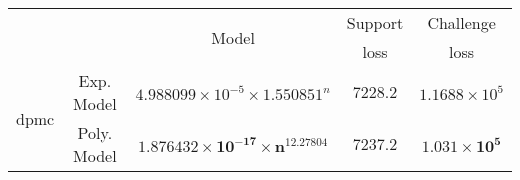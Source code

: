 \begin{tabular}{ccccc} 
\hline 
 &  & \multirow{2}{*}{Model} & Support & Challenge\tabularnewline 
 &  &  & loss  & loss\tabularnewline 
\hline 
\hline 
\multirow{2}{*}{dpmc} & Exp. Model & $4.988099\times10^{-5}\times 1.550851^{n}$ & $7228.2$ & $1.1688\times10^{5}$ \tabularnewline 
 & Poly. Model & $\mathbf{1.876432\times10^{-17}\times n^{12.27804}}$ & $\mathbf{7237.2}$ & $\mathbf{1.031\times10^{5}}$ \tabularnewline 
\hline 
\end{tabular} 

